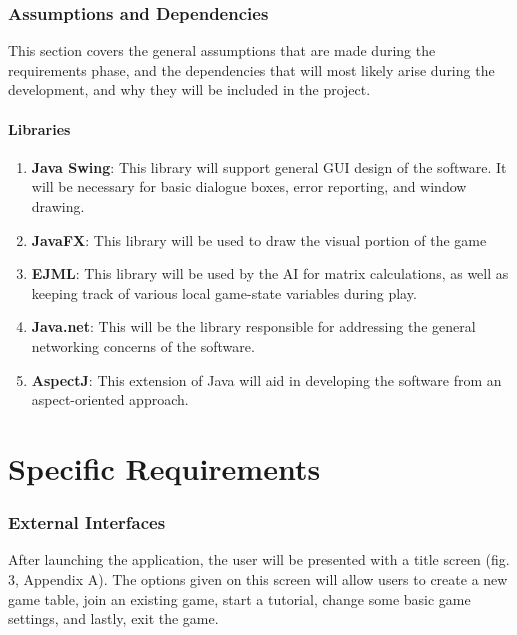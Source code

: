\documentclass[12pt]{article}
\begin{document}
\section{Assumptions and Dependencies}

This section covers the general assumptions that are made during the requirements
phase, and the dependencies that will most likely arise during the development,
and why they will be included in the project.

\subsection{Libraries}

\begin{enumerate}
\item \textbf{Java Swing}:
This library will support general GUI design of the software. It will
be necessary for basic dialogue boxes, error reporting, and window drawing.
\item \textbf{JavaFX}:
This library will be used to draw the visual portion of the game
\item \textbf{EJML}:
This library will be used by the AI for matrix calculations, as well
as keeping track of various local game-state variables during play.
\item \textbf{Java.net}:
This will be the library responsible for addressing the general
networking concerns of the software.
\item \textbf{AspectJ}:
This extension of Java will aid in developing the software from an
aspect-oriented approach.
\end{enumerate}

\newpage
\part{Specific Requirements}
\setcounter{section}{0}
\section{External Interfaces}

After launching the application, the user will be presented with a title screen 
(fig. 3, Appendix A). The options given on this screen will allow users to create a new 
game table, join an existing game, start a tutorial, change 
some basic game settings, and lastly, exit the game.
\end{document}
